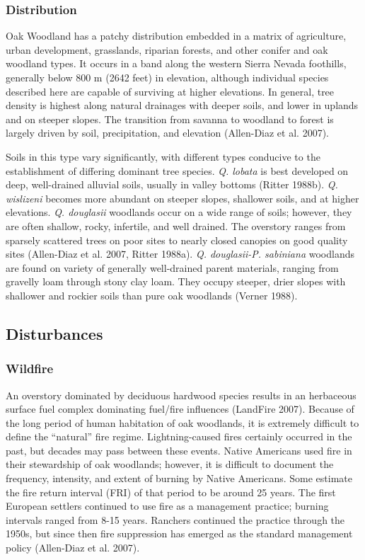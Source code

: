 \subsubsection*{Distribution}
Oak Woodland has a patchy distribution embedded in a matrix of agriculture, urban development, grasslands, riparian forests, and other conifer and oak woodland types. It occurs in a band along the western Sierra Nevada foothills, generally below 800 m (2642 feet) in elevation, although individual species described here are capable of surviving at higher elevations. In general, tree density is highest along natural drainages with deeper soils, and lower in uplands and on steeper slopes. The transition from savanna to woodland to forest is largely driven by soil, precipitation, and elevation (Allen-Diaz et al. 2007).

Soils in this type vary significantly, with different types conducive to the establishment of differing dominant tree species. \emph{Q. lobata} is best developed on deep, well-drained alluvial soils, usually in valley bottoms (Ritter 1988b). \emph{Q. wislizeni} becomes more abundant on steeper slopes, shallower soils, and at higher elevations. \emph{Q. douglasii} woodlands occur on a wide range of soils; however, they are often shallow, rocky, infertile, and well drained. The overstory ranges from sparsely scattered trees on poor sites to nearly closed canopies on good quality sites (Allen-Diaz et al. 2007, Ritter 1988a). \emph{Q. douglasii-P. sabiniana} woodlands are found on variety of generally well-drained parent materials, ranging from gravelly loam through stony clay loam. They occupy steeper, drier slopes with shallower and rockier soils than pure oak woodlands (Verner 1988). 


\subsection*{Disturbances}

\subsubsection*{Wildfire}
An overstory dominated by deciduous hardwood species results in an herbaceous surface fuel complex dominating fuel/fire influences (LandFire 2007). Because of the long period of human habitation of oak woodlands, it is extremely difficult to define the ``natural'' fire regime. Lightning-caused fires certainly occurred in the past, but decades may pass between these events. Native Americans used fire in their stewardship of oak woodlands; however, it is difficult to document the frequency, intensity, and extent of burning by Native Americans. Some estimate the fire return interval (FRI) of that period to be around 25 years. The first European settlers continued to use fire as a management practice; burning intervals ranged from 8-15 years. Ranchers continued the practice through the 1950s, but since then fire suppression has emerged as the standard management policy (Allen-Diaz et al. 2007).  

